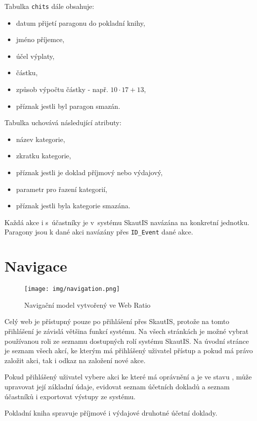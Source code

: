\documentclass[thesis=B,czech]{FITthesis}[2012/04/27]
\begin{document}
Tabulka \texttt{chits} dále obsahuje:
 \begin{itemize}
 	\item datum přijetí paragonu do pokladní knihy,
 	\item jméno příjemce,
 	\item účel výplaty,
 	\item částku,
	\item způsob výpočtu částky - např. $10\cdot17+13$,
	\item příznak jestli byl paragon smazán.
\end{itemize} 

Tabulka  uchovává následující atributy:
 \begin{itemize}
 	\item název kategorie,
 	\item zkratku kategorie,
 	\item příznak jestli je doklad příjmový nebo výdajový,
 	\item parametr pro řazení kategorií,
 	\item příznak jestli byla kategorie smazána.
\end{itemize}

Každá akce i s~účastníky je v~systému SkautIS navázána na konkretní jednotku. Paragony jsou k dané akci navázány přes \texttt{ID\_Event} dané akce. 

\section{Navigace}
 \begin{figure}[h] \centering
 	\texttt{[image: img/navigation.png]}
 	\caption[Navigační model]{Navigační model vytvořený ve Web Ratio}\label{fig:navigation-diagram}
 \end{figure}

Celý web je přístupný pouze po přihlášení přes SkautIS, protože na tomto přihlášení je závislá většina funkcí systému. Na všech stránkách je možné vybrat používanou roli ze seznamu dostupných rolí systému SkautIS. Na úvodní stránce je seznam všech akcí, ke kterým má přihlášený uživatel přístup a pokud má právo založit akci, tak i odkaz na založení nové akce.

Pokud přihlášený uživatel vybere akci ke které má oprávnění a je ve stavu , může upravovat její základní údaje, evidovat seznam účetních dokladů a seznam účastníků i exportovat výstupy ze systému.

Pokladní kniha spravuje příjmové i výdajové druhotné účetní doklady. 
\end{document}
